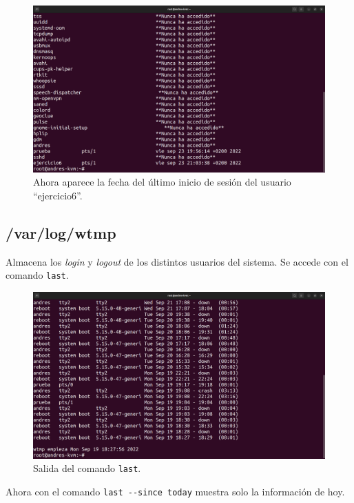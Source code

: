 \documentclass{article}
\begin{document}
\begin{figure}[H]
    \includegraphics[width=\textwidth]{imagenes/lastlogejercicio6ok.png}
    \caption{Ahora aparece la fecha del último inicio de sesión del usuario ``ejercicio6''.}
\end{figure}


\subsection{/var/log/wtmp}
Almacena los \textit{login} y \textit{logout} de los distintos usuarios del sistema. Se accede con el comando \verb|last|. 

\begin{figure}[H]
    \includegraphics[width=\textwidth]{imagenes/lastnormal.png}
    \caption{Salida del comando \texttt{last}.}
\end{figure}

\newpage

Ahora con el comando \verb|last --since today| muestra solo la información de hoy.
\end{document}
